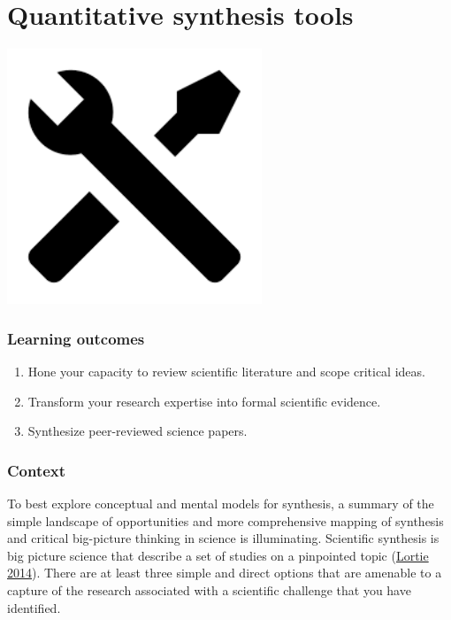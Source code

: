 \documentclass[
]{book}
\providecommand{\tightlist}{%
  \setlength{\itemsep}{0pt}\setlength{\parskip}{0pt}}
\begin{document}
\hypertarget{tools}{%
\chapter{Quantitative synthesis tools}\label{tools}}

\includegraphics[width=3in,height=\textheight]{./tools.png}

\hypertarget{learning-outcomes-1}{%
\subsection*{Learning outcomes}\label{learning-outcomes-1}}

\begin{enumerate}
\def\labelenumi{\arabic{enumi}.}
\tightlist
\item
  Hone your capacity to review scientific literature and scope critical ideas.
\item
  Transform your research expertise into formal scientific evidence.\\
\item
  Synthesize peer-reviewed science papers.
\end{enumerate}

\hypertarget{context}{%
\subsection*{Context}\label{context}}

To best explore conceptual and mental models for synthesis, a summary of the simple landscape of opportunities and more comprehensive mapping of synthesis and critical big-picture thinking in science is illuminating. Scientific synthesis is big picture science that describe a set of studies on a pinpointed topic (\href{https://onlinelibrary.wiley.com/doi/full/10.1111/j.1600-0706.2013.00970.x}{Lortie 2014}). There are at least three simple and direct options that are amenable to a capture of the research associated with a scientific challenge that you have identified.
\end{document}
